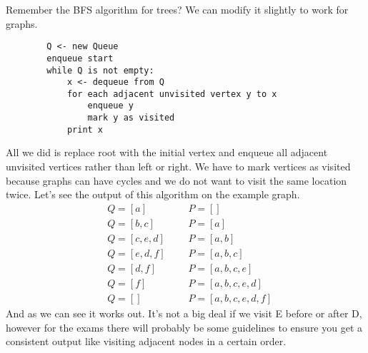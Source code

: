 \documentclass[11pt]{book}
\begin{document}
		\noindent Remember the BFS algorithm for trees? We can modify it slightly
		to work for graphs.
		\begin{verbatim}
		Q <- new Queue
		enqueue start
		while Q is not empty:
		    x <- dequeue from Q
		    for each adjacent unvisited vertex y to x
		        enqueue y
		        mark y as visited
		    print x
		\end{verbatim}
		All we did is replace root with the initial vertex and enqueue all
		adjacent unvisited vertices rather than left or right. We have to mark
		vertices as visited because graphs can have cycles and we do not want
		to visit the same location twice. Let's see the output of this algorithm
		on the example graph.
		\begin{align*}
			& Q = [a] & \text{    } & P = [] \\
			& Q = [b,c] & \text{    } & P = [a] \\
			& Q = [c,e,d] & \text{    } & P = [a,b] \\
			& Q = [e,d,f] & \text{    } & P = [a,b,c] \\
			& Q = [d,f] & \text{    } & P = [a,b,c,e] \\
			& Q = [f] & \text{    } & P = [a,b,c,e,d] \\
			& Q = [] & \text{    } & P = [a,b,c,e,d,f]
		\end{align*}
		And as we can see it works out. It's not a big deal if we visit E before
		or after D, however for the exams there will probably be some guidelines
		to ensure you get a consistent output like visiting adjacent nodes in a
		certain order.

	\pagebreak
\end{document}

